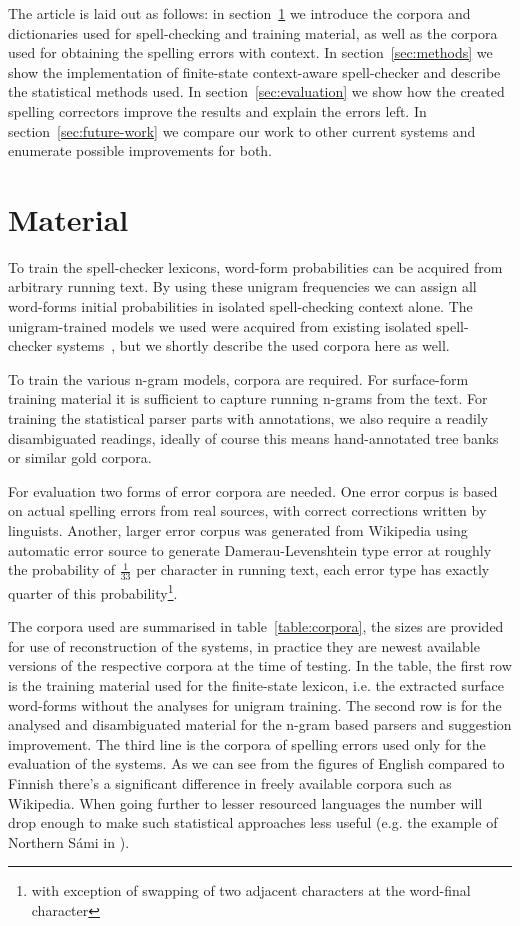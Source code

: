 \documentclass[11pt,a4paper]{article}
\begin{document}
The article is laid out as follows: in section~\ref{sec:material} we introduce
the corpora and dictionaries used for spell-checking and training material, as
well as the corpora used for obtaining the spelling errors with context. In
section~\ref{sec:methods} we show the implementation of finite-state
context-aware spell-checker and describe the statistical methods used. In
section~\ref{sec:evaluation} we show how the created spelling correctors
improve the results and explain the errors left. In
section~\ref{sec:future-work} we compare our work to other current systems and
enumerate possible improvements for both.

\section{Material}
\label{sec:material}

To train the spell-checker lexicons, word-form probabilities can be acquired
from arbitrary running text. By using these unigram frequencies we can assign
all word-forms initial probabilities in isolated spell-checking context alone.
The unigram-trained models we used were acquired from existing isolated
spell-checker systems~\cite{norvig/2010,pirinen/2010/lrec}, but we shortly
describe the used corpora here as well.

To train the various n-gram models, corpora are required. For surface-form
training material it is sufficient to capture running n-grams from the text.
For training the statistical parser parts with annotations, we also require a
readily disambiguated readings, ideally of course this means hand-annotated
tree banks or similar gold corpora. 

For evaluation two forms of error corpora are needed. One error corpus is based
on actual spelling errors from real sources, with correct corrections
written by linguists. Another, larger error corpus was generated from Wikipedia
using automatic error source to generate Damerau-Levenshtein type error at
roughly the probability of $\frac{1}{33}$ per character in running text, each
error type has exactly quarter of this probability\footnote{with exception of
swapping of two adjacent characters at the word-final character}. 

The corpora used are summarised in table~\ref{table:corpora}, the sizes are
provided for use of reconstruction of the systems, in practice they are newest
available versions of the respective corpora at the time of testing. In the
table, the first row is the training material used for the finite-state
lexicon, i.e. the extracted surface word-forms without the analyses for unigram
training. The second row is for the analysed and disambiguated material for the
n-gram based parsers and suggestion improvement. The third line is the corpora
of spelling errors used only for the evaluation of the systems.  As we can see
from the figures of English compared to Finnish there's a significant
difference in freely available corpora such as Wikipedia. When going further to
lesser resourced languages the number will drop enough to make such statistical
approaches less useful (e.g. the example of Northern S\'{a}mi in
).
\end{document}
